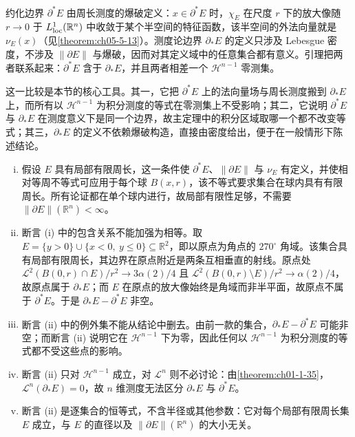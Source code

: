 \documentclass[../../main.tex]{subfiles}%
\begin{document}
\begin{remark}\label{remark:ch05-lem-5-5-动机}
约化边界 $\partial^*E$ 由周长测度的爆破定义：$x\in\partial^*E$ 时，$\chi_E$ 在尺度 $r$ 下的放大像随 $r\to0$ 于 $L^1_{\mathrm{loc}}(\mathbb{R}^n)$ 中收敛于某个半空间的特征函数，该半空间的外法向量就是 $\nu_E(x)$（见\cref{theorem:ch05-5-13}）。测度论边界 $\partial_*E$ 的定义只涉及 Lebesgue 密度，不涉及 $\lVert\partial E\rVert$ 与爆破，因而对其定义域中的任意集合都有意义。引理把两者联系起来：$\partial^*E$ 含于 $\partial_*E$，并且两者相差一个 $\mathcal{H}^{n-1}$ 零测集。 %

这一比较是本节的核心工具。其一，它把 $\partial^*E$ 上的法向量场与周长测度搬到 $\partial_*E$ 上，而所有以 $\mathcal{H}^{n-1}$ 为积分测度的等式在零测集上不受影响；其二，它说明 $\partial^*E$ 与 $\partial_*E$ 在测度意义下是同一个边界，故主定理中的积分区域取哪一个都不改变等式；其三，$\partial_*E$ 的定义不依赖爆破构造，直接由密度给出，便于在一般情形下陈述结论。
\end{remark}

\begin{remark}\label{remark:ch05-lem-5-5-条件}
\begin{enumerate}[(i)]
\item 假设 $E$ 具有局部有限周长，这一条件使 $\partial^*E$、$\lVert\partial E\rVert$ 与 $\nu_E$ 有定义，并使相对等周不等式可应用于每个球 $B(x,r)$，该不等式要求集合在球内具有有限周长。所有论证都在单个球内进行，故局部有限性足够，不需要 $\lVert\partial E\rVert(\mathbb{R}^n)<\infty$。
\item 断言 (i) 中的包含关系不能加强为相等。取 $E=\{y>0\}\cup\{x<0,\ y\leqslant0\}\subseteq\mathbb{R}^2$，即以原点为角点的 $270^\circ$ 角域。该集合具有局部有限周长，其边界在原点附近是两条互相垂直的射线。原点处 $\mathcal{L}^2(B(0,r)\cap E)/r^2\to3\alpha(2)/4$ 且 $\mathcal{L}^2(B(0,r)\setminus E)/r^2\to\alpha(2)/4$，故原点属于 $\partial_*E$；而 $E$ 在原点的放大像始终是角域而非半平面，故原点不属于 $\partial^*E$。于是 $\partial_*E-\partial^*E$ 非空。
\item 断言 (ii) 中的例外集不能从结论中删去。由前一款的集合，$\partial_*E-\partial^*E$ 可能非空；而断言 (ii) 说明它在 $\mathcal{H}^{n-1}$ 下为零，因此任何以 $\mathcal{H}^{n-1}$ 为积分测度的等式都不受这些点的影响。
\item 断言 (ii) 只对 $\mathcal{H}^{n-1}$ 成立，对 $\mathcal{L}^n$ 则不必讨论：由\cref{theorem:ch01-1-35}，$\mathcal{L}^n(\partial_*E)=0$，故 $n$ 维测度无法区分 $\partial_*E$ 与 $\partial^*E$。%
\item 断言 (ii) 是逐集合的恒等式，不含半径或其他参数：它对每个局部有限周长集 $E$ 成立，与 $E$ 的直径以及 $\lVert\partial E\rVert(\mathbb{R}^n)$ 的大小无关。
\end{enumerate}
\end{remark}
\end{document}
